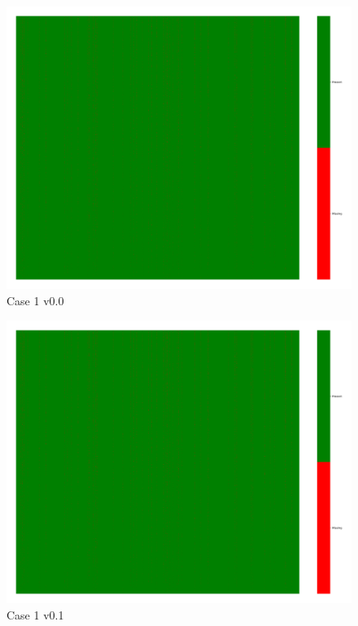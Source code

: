 \documentclass[a4paper,12pt]{article}
\begin{document}
\begin{figure}[H]
    \includegraphics[width=\linewidth]{case1_v0.0_heatmap_cleaned.png}
    \caption*{Case 1 v0.0}
\end{figure}

\begin{figure}[H]
    \includegraphics[width=\linewidth]{case1_v0.1_heatmap_cleaned.png}
    \caption*{Case 1 v0.1}
\end{figure}
\end{document}

